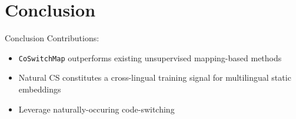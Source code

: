 \documentclass[english]{beamer}
\begin{document}
\section{Conclusion}

\begin{frame}{Conclusion}
Contributions:
	\begin{itemize}
		\item \texttt{CoSwitchMap} outperforms existing unsupervised mapping-based methods
		\item Natural CS constitutes a cross-lingual training signal for multilingual static embeddings
		\item Leverage naturally-occuring code-switching 
	\end{itemize}
\vspace*{0.3cm}
\end{frame}

\appendix
\end{document}
